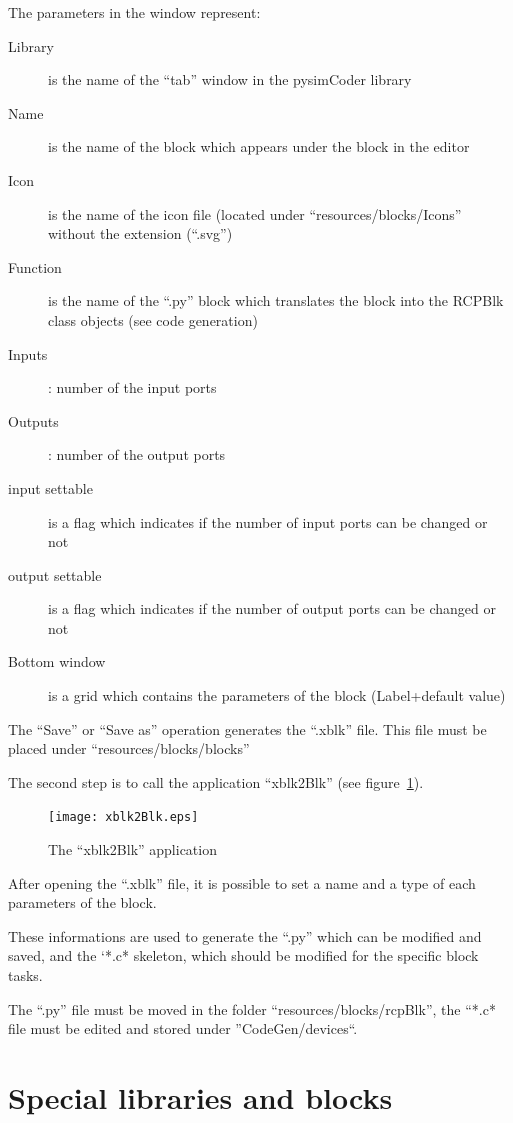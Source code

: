 The parameters in the window represent:
\begin{description}
\item[Library] is the name of the ``tab'' window in the pysimCoder library
\item [Name] is the name of the block which appears under the block in the editor
\item [Icon] is the name of the icon file (located under ``resources/blocks/Icons'' without the extension (``.svg'')
\item [Function] is the name of the ``.py'' block which translates the block into the RCPBlk class objects (see code generation)
\item [Inputs]: number of the input ports
\item [Outputs]: number of the output ports
\item [input settable]is a flag which indicates if the number of input ports can be changed or not
\item [output settable]is a flag which indicates if the number of output ports can be changed or not
\item [Bottom window] is a grid which contains the parameters of the block (Label+default value)
\end{description}

The ``Save'' or ``Save as'' operation generates the ``.xblk'' file. This file must be placed under ``resources/blocks/blocks''

The second step is to call the application ``xblk2Blk'' (see figure~\ref{Fig:xblk2Blk}).

\begin{figure}[htbp]	%
\centering
\texttt{[image: xblk2Blk.eps]}
\caption{The ``xblk2Blk'' application}
\label{Fig:xblk2Blk}
\end{figure}

After opening the ``.xblk'' file, it is possible to set a name and a type of each parameters of the block.

These informations are used to generate the ``.py'' which can be modified and saved, and the `*.c* skeleton, which should be modified for the specific block tasks.

The ``.py'' file must be moved in the folder ``resources/blocks/rcpBlk'', the ``*.c* file must be edited and stored under ''CodeGen/devices``.

\section{Special libraries and blocks}

